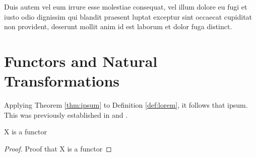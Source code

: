 \documentclass{article}
\begin{document}
\begin{theorem}\label{thm:ipsum}
	Duis autem vel eum irrure esse molestiae consequat, vel illum dolore eu fugi et iusto odio dignissim qui blandit praesent luptat exceptur sint occaecat cupiditat non provident, deserunt mollit anim id est laborum et dolor fuga distinct.
\end{theorem}



\section{Functors and Natural Transformations}

Applying Theorem \ref{thm:ipsum} to Definition \ref{def:lorem}, it follows that ipsum. This was previously established in \cite{Gauss86} and \cite{Euclid02,Euclid03}.

\begin{theorem}
X is a functor
\end{theorem}
\begin{proof}
Proof that X is a functor
\end{proof}





\end{document}
